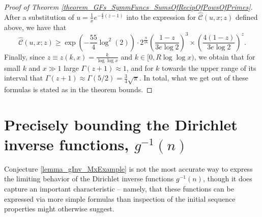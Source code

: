 \documentclass[11pt,reqno,a4letter]{article}
\numberwithin{figure}{section}
\numberwithin{table}{section}
\theoremstyle{plain}
\numberwithin{theorem}{section}
\theoremstyle{definition}
\newtheorem{heuristic}[theorem]{Heuristic}
\begin{document}
\begin{proof}[Proof of Theorem \ref{theorem_GFs_SymmFuncs_SumsOfRecipOfPowsOfPrimes}]
After a substitution of $u = \frac{1}{x} e^{-\frac{4}{3}(z-1)}$ into the expression for 
$\widehat{\mathcal{C}}(u, x; z)$ defined above, we have that 
\[
\widehat{\mathcal{C}}(u, x; z) \geq \exp\left(-\frac{55}{4} \log^2(2)\right) \cdot 2^{\frac{9}{16}} 
     \left(\frac{1-z}{3e\log 2}\right)^3 \times \left(\frac{4(1-z)}{3e\log 2}\right)^z. 
\]
Finally, since $z \equiv z(k, x) = \frac{k}{\log\log x}$ and $k \in [0, R\log\log x)$, we obtain that 
for small $k$ and $x \gg 1$ large $\Gamma(z+1) \approx 1$, and for $k$ towards the upper range of 
its interval that $\Gamma(z+1) \approx \Gamma(5/2) = \frac{3}{4} \sqrt{\pi}$. 
In total, what we get out of these formulas is stated as in the theorem bounds. 
\end{proof} 

\newpage
\section{Precisely bounding the 
         Dirichlet inverse functions, $g^{-1}(n)$} 
\label{Section_InvFunc_PreciseExpsAndAsymptotics} 

Conjecture \ref{lemma_gInv_MxExample} is not the most accurate way to express the limiting behavior of the 
Dirichlet inverse functions $g^{-1}(n)$, though it does capture an important characteristic -- namely, that these 
functions can be expressed via more simple formulas than inspection of the initial sequence properties might 
otherwise suggest. 
\end{document}
